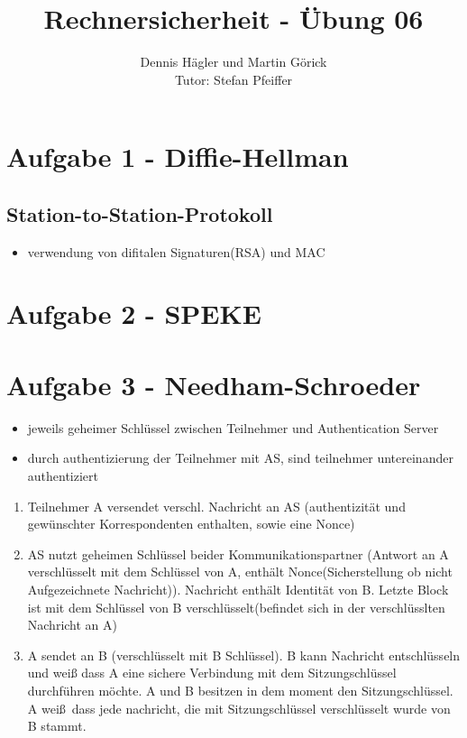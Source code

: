 \documentclass{scrartcl}
\title{Rechnersicherheit - Übung 06}
\author{Dennis Hägler und Martin Görick \\ Tutor: Stefan Pfeiffer}
\begin{document}
\maketitle


\section{Aufgabe 1 - Diffie-Hellman}
\subsection{Station-to-Station-Protokoll}
\begin{itemize}
  \item verwendung von difitalen Signaturen(RSA) und MAC
\end{itemize}

\section{Aufgabe 2 - SPEKE}

\section{Aufgabe 3 - Needham-Schroeder}
\begin{itemize}
  \item jeweils geheimer Schlüssel zwischen Teilnehmer und Authentication Server
  \item durch authentizierung der Teilnehmer mit AS, sind teilnehmer
    untereinander authentiziert
\end{itemize}
\begin{enumerate}
  \item Teilnehmer A versendet verschl. Nachricht an AS (authentizität und
    gewünschter Korrespondenten enthalten, sowie eine Nonce)
  \item AS nutzt geheimen Schlüssel beider Kommunikationspartner (Antwort an A
    verschlüsselt mit dem Schlüssel von A, enthält Nonce(Sicherstellung ob
    nicht Aufgezeichnete Nachricht)). Nachricht enthält Identität von B.
    Letzte Block ist mit dem Schlüssel von B verschlüsselt(befindet sich in der
    verschlüsslten Nachricht an A)
  \item A sendet an B (verschlüsselt mit B Schlüssel). B kann Nachricht
    entschlüsseln und weiß dass A eine sichere Verbindung mit dem
    Sitzungschlüssel durchführen möchte. A und B besitzen in dem moment den
    Sitzungschlüssel. A weiß dass jede nachricht, die mit Sitzungschlüssel
    verschlüsselt wurde von B stammt.
\end{enumerate}
\end{document}
